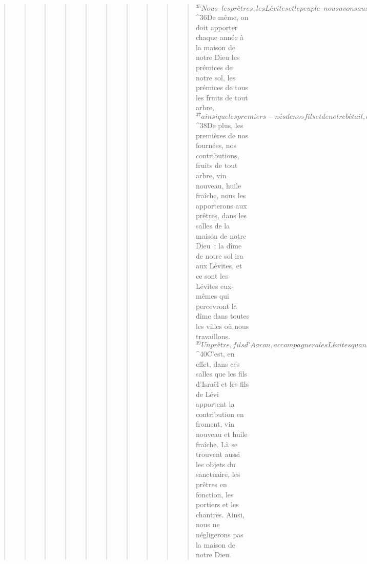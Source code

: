 \begin{verse}
\begin{verse}
\begin{verse}
\begin{verse}
\begin{verse}
\begin{verse}
\begin{verse}
\begin{verse}
\begin{verse}
\begin{verse}
${}^{35}Nous – les prêtres, les Lévites et le peuple – nous avons aussi réglé par le sort la question de l’offrande de bois que l’on doit apporter à la maison de notre Dieu, chaque famille à son tour, aux temps fixés, chaque année, pour allumer le feu sur l’autel du Seigneur notre Dieu, comme il est écrit dans la Loi. 
${}^{36}De même, on doit apporter chaque année à la maison de notre Dieu les prémices de notre sol, les prémices de tous les fruits de tout arbre, 
${}^{37}ainsi que les premiers-nés de nos fils et de notre bétail, comme il est écrit dans la Loi. Les premiers-nés de notre gros et de notre petit bétail qu’on apporte à la maison de notre Dieu sont destinés aux prêtres en fonction dans la maison de notre Dieu. 
${}^{38}De plus, les premières de nos fournées, nos contributions, fruits de tout arbre, vin nouveau, huile fraîche, nous les apporterons aux prêtres, dans les salles de la maison de notre Dieu ; la dîme de notre sol ira aux Lévites, et ce sont les Lévites eux-mêmes qui percevront la dîme dans toutes les villes où nous travaillons. 
${}^{39}Un prêtre, fils d’Aaron, accompagnera les Lévites quand ils percevront la dîme ; les Lévites prélèveront le dixième de la dîme pour la maison de notre Dieu, et l’apporteront dans les salles de la maison du Trésor. 
${}^{40}C’est, en effet, dans ces salles que les fils d’Israël et les fils de Lévi apportent la contribution en froment, vin nouveau et huile fraîche. Là se trouvent aussi les objets du sanctuaire, les prêtres en fonction, les portiers et les chantres. Ainsi, nous ne négligerons pas la maison de notre Dieu.
      

\end{verse}
\end{verse}
\end{verse}
\end{verse}
\end{verse}
\end{verse}
\end{verse}
\end{verse}
\end{verse}
\end{verse}
